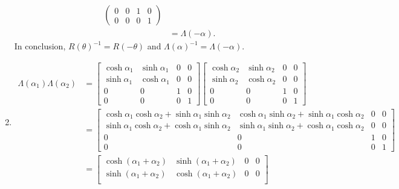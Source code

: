 \documentclass{article}
\begin{document}
\begin{enumerate}[label=(\alph*)]
\begin{align*}
\begin{pmatrix}
                                 0 & 0 & 1 & 0 \\
                                 0 & 0 & 0 & 1
                             \end{pmatrix} \\
                             &= \Lambda(-\alpha).
    \end{align*}
    In conclusion, $R(\theta)^{-1}=R(-\theta)$ and $\Lambda(\alpha)^{-1}=\Lambda(-\alpha)$.
\item \begin{align*}
        \Lambda(\alpha_1) \Lambda(\alpha_2) &= \begin{bmatrix}
            \cosh \alpha_1 & \sinh \alpha_1 & 0 & 0 \\
            \sinh \alpha_1 & \cosh \alpha_1 & 0 & 0 \\
            0 & 0 & 1 & 0 \\
            0 & 0 & 0 & 1
        \end{bmatrix} \begin{bmatrix}
            \cosh \alpha_2 & \sinh \alpha_2 & 0 & 0 \\
            \sinh \alpha_2 & \cosh \alpha_2 & 0 & 0 \\
            0 & 0 & 1 & 0 \\
            0 & 0 & 0 & 1
        \end{bmatrix} \\
                                            &= \begin{bmatrix}
                                                \cosh \alpha_1 \cosh \alpha_2 + \sinh \alpha_1 \sinh \alpha_2 & \cosh \alpha_1 \sinh \alpha_2 + \sinh \alpha_1 \cosh \alpha_2 & 0 & 0 \\
                                                \sinh \alpha_1 \cosh \alpha_2 + \cosh \alpha_1 \sinh \alpha_2 & \sinh \alpha_1 \sinh \alpha_2 + \cosh \alpha_1 \cosh \alpha_2 & 0 & 0 \\
            0 & 0 & 1 & 0 \\
            0 & 0 & 0 & 1
                                            \end{bmatrix} \\
                                            &= \begin{bmatrix}
                                                \cosh(\alpha_1 + \alpha_2) & \sinh(\alpha_1 + \alpha_2) & 0 & 0 \\
                                                \sinh(\alpha_1 + \alpha_2) & \cosh(\alpha_1 + \alpha_2) & 0 & 0 \\

\end{bmatrix}
\end{align*}
\end{enumerate}
\end{document}
